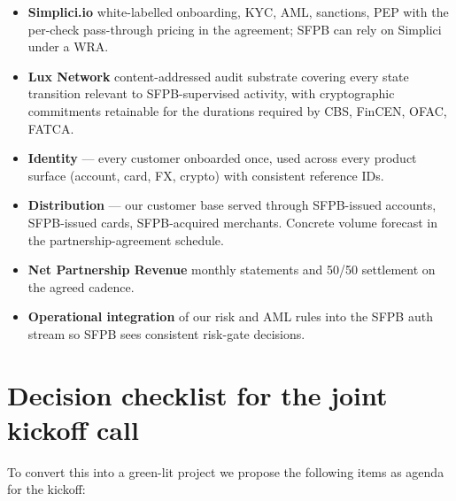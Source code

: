 \documentclass[11pt,letterpaper]{article}
\begin{document}
\begin{itemize}[leftmargin=1.6em]
  \item \textbf{Simplici.io} white-labelled onboarding, KYC, AML,
        sanctions, PEP with the per-check pass-through pricing in
        the agreement; SFPB can rely on Simplici under a WRA.
  \item \textbf{Lux Network} content-addressed audit substrate
        covering every state transition relevant to SFPB-supervised
        activity, with cryptographic commitments retainable for the
        durations required by CBS, FinCEN, OFAC, FATCA.
  \item \textbf{Identity} --- every customer onboarded once, used
        across every product surface (account, card, FX, crypto) with
        consistent reference IDs.
  \item \textbf{Distribution} --- our customer base served through
        SFPB-issued accounts, SFPB-issued cards, SFPB-acquired
        merchants. Concrete volume forecast in the partnership-agreement
        schedule.
  \item \textbf{Net Partnership Revenue} monthly statements and 50/50
        settlement on the agreed cadence.
  \item \textbf{Operational integration} of our risk and AML rules
        into the SFPB auth stream so SFPB sees consistent risk-gate
        decisions.
\end{itemize}

\section{Decision checklist for the joint kickoff call}

To convert this into a green-lit project we propose the following items
as agenda for the kickoff:
\end{document}
